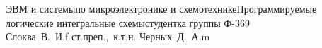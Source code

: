


\usepackage{color}
\usepackage[colorlinks,linkcolor=black,filecolor=blue,citecolor=darkgreen]{hyperref}

\renewcommand{\thesection}{\arabic{section}.}

    {ЭВМ и системы}{по микроэлектронике и схемотехнике}{Программируемые
    логические интегральные схемы}{студентка группы Ф-369\\Слоква~В.~И.}{f}
    {ст.преп.,~к.т.н. Черных~Д.~А.}{m}
        
    \tableofcontents
    \thispagestyle{empty}
    \newpage
    

